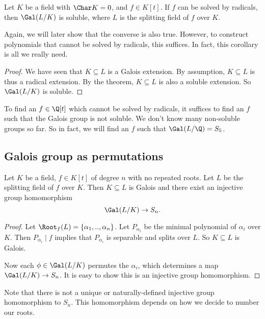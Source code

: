 \documentclass[a4paper]{article}
\begin{document}
\begin{cor}
  Let $K$ be a field with $\Char K = 0$, and $f \in K[t]$. If $f$ can be solved by radicals, then $\Gal(L/K)$ is soluble, where $L$ is the splitting field of $f$ over $K$.
\end{cor}
Again, we will later show that the converse is also true. However, to construct polynomials that cannot be solved by radicals, this suffices. In fact, this corollary is all we really need.

\begin{proof}
  We have seen that $K\subseteq L$ is a Galois extension. By assumption, $K\subseteq L$ is thus a radical extension. By the theorem, $K\subseteq L$ is also a soluble extension. So $\Gal(L/K)$ is soluble.
\end{proof}

To find an $f \in \Q[t]$ which cannot be solved by radicals, it suffices to find an $f$ such that the Galois group is not soluble. We don't know many non-soluble groups so far. So in fact, we will find an $f$ such that $\Gal(L/\Q) = S_5$.

\subsection{Galois group as permutations}
\begin{lemma}
  Let $K$ be a field, $f \in K[t]$ of degree $n$ with no repeated roots. Let $L$ be the splitting field of $f$ over $K$. Then $K\subseteq L$ is Galois and there exist an injective group homomorphism
  \[
    \Gal(L/K) \to S_n.
  \]
\end{lemma}

\begin{proof}
  Let $\Root_f(L) = \{\alpha_1, .., \alpha_n\}$. Let $P_{\alpha_i}$ be the minimal polynomial of $\alpha_i$ over $K$. Then $P_{\alpha_i} \mid f$ implies that $P_{\alpha_i}$ is separable and splits over $L$. So $K\subseteq L$ is Galois.

  Now each $\phi \in \Gal(L/K)$ permutes the $\alpha_i$, which determines a map $\Gal(L/K) \to S_n$. It is easy to show this is an injective group homomorphism.
\end{proof}
Note that there is not a unique or naturally-defined injective group homomorphism to $S_n$. This homomorphism depends on how we decide to number our roots.
\end{document}
